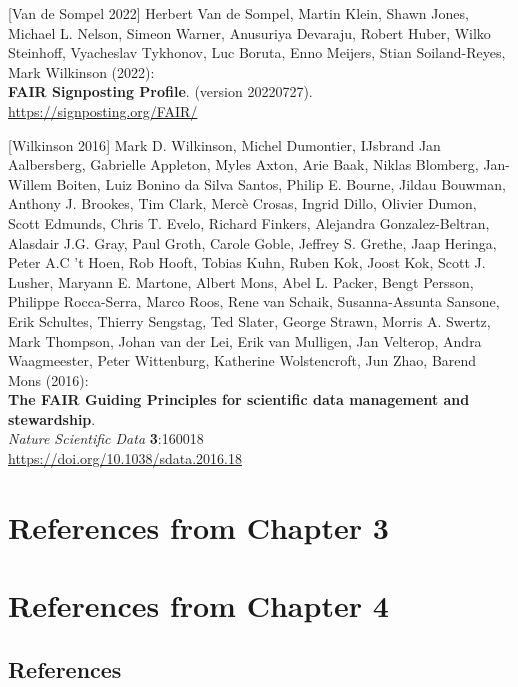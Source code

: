 {[}Van de Sompel 2022{]} Herbert Van de Sompel, Martin Klein, Shawn
Jones, Michael L. Nelson, Simeon Warner, Anusuriya Devaraju, Robert
Huber, Wilko Steinhoff, Vyacheslav Tykhonov, Luc Boruta, Enno Meijers,
Stian Soiland-Reyes, Mark Wilkinson (2022):\\
\textbf{FAIR Signposting Profile}. (version 20220727).\\
\url{https://signposting.org/FAIR/}

{[}Wilkinson 2016{]} Mark D. Wilkinson, Michel Dumontier, IJsbrand Jan
Aalbersberg, Gabrielle Appleton, Myles Axton, Arie Baak, Niklas
Blomberg, Jan-Willem Boiten, Luiz Bonino da Silva Santos, Philip E.
Bourne, Jildau Bouwman, Anthony J. Brookes, Tim Clark, Mercè Crosas,
Ingrid Dillo, Olivier Dumon, Scott Edmunds, Chris T. Evelo, Richard
Finkers, Alejandra Gonzalez-Beltran, Alasdair J.G. Gray, Paul Groth,
Carole Goble, Jeffrey S. Grethe, Jaap Heringa, Peter A.C 't Hoen, Rob
Hooft, Tobias Kuhn, Ruben Kok, Joost Kok, Scott J. Lusher, Maryann E.
Martone, Albert Mons, Abel L. Packer, Bengt Persson, Philippe
Rocca-Serra, Marco Roos, Rene van Schaik, Susanna-Assunta Sansone, Erik
Schultes, Thierry Sengstag, Ted Slater, George Strawn, Morris A. Swertz,
Mark Thompson, Johan van der Lei, Erik van Mulligen, Jan Velterop, Andra
Waagmeester, Peter Wittenburg, Katherine Wolstencroft, Jun Zhao, Barend
Mons (2016):\\
\textbf{The FAIR Guiding Principles for scientific data management and
stewardship}.\\
\emph{Nature Scientific Data} \textbf{3}:160018\\
\url{https://doi.org/10.1038/sdata.2016.18}




\section{References from Chapter 3}


\section{References from Chapter 4}

\hypertarget{references-1}{%
\subsection{References}\label{references-1}}

